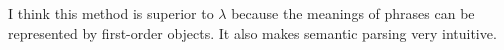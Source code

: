 I think this method is superior to $\lambda$ because the meanings of phrases can be represented by first-order objects.  It also makes semantic parsing very intuitive.



%
%
%
%

